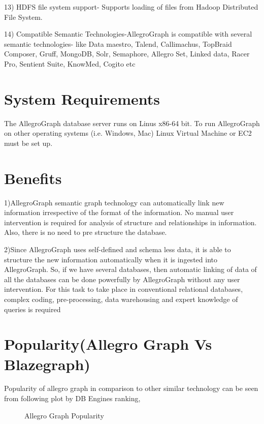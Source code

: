 \documentclass[9pt,twocolumn,twoside]{styles/osajnl}
\begin{document}
13) HDFS file system support- Supports loading of files from Hadoop Distributed File System.

14) Compatible Semantic Technologies-AllegroGraph is compatible with several semantic technologies-
like Data maestro, Talend, Callimachus, TopBraid Composer, Gruff, MongoDB, Solr, Semaphore, Allegro Set, Linked data, Racer Pro, Sentient Suite, KnowMed, Cogito etc \cite{fag}

\section{System Requirements}
The AllegroGraph database server runs on Linus x86-64 bit. To run AllegroGraph on other operating systems (i.e. Windows, Mac) Linux Virtual Machine or EC2 must be set up.
\cite{fag}

\section{Benefits}
1)AllegroGraph semantic graph technology can automatically link new information irrespective of the format of the information. No manual user intervention is required for analysis of structure and relationships in information. Also, there is no need to pre structure the database.

2)Since AllegroGraph uses self-defined and schema less data, it is able to structure the new information automatically when it is ingested into AllegroGraph. So, if we have several databases, then automatic linking of data of all the databases can be done powerfully by AllegroGraph without any user intervention. For this task to take place in conventional relational databases, complex coding, pre-processing, data warehousing and expert knowledge of queries is required \cite{fag}

\section{Popularity(Allegro Graph Vs Blazegraph)}
Popularity of allegro graph in comparison to other similar technology can be seen from following plot by DB Engines ranking,

\begin{figure}[htbp]
	\centering
	\caption{Allegro Graph Popularity}
	\label{fig:Allegro-Popularity}
\end{figure}
\cite{dbe}
\end{document}
